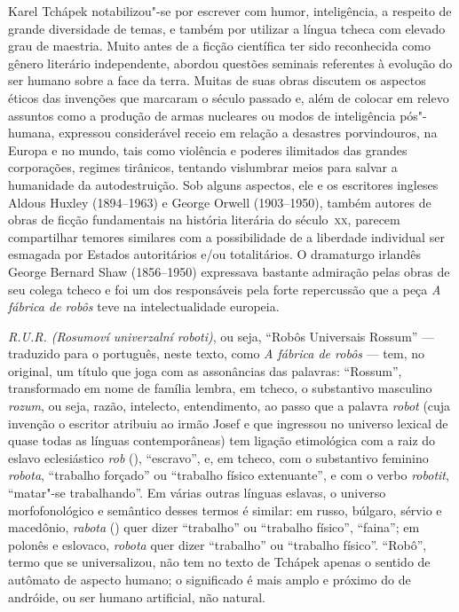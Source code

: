 Karel Tchápek notabilizou"-se por escrever com humor, inteligência, a respeito
de grande diversidade de temas, e também por utilizar a língua tcheca com
elevado grau de maestria. Muito antes de a ficção científica ter sido
reconhecida como gênero literário independente, abordou questões seminais
referentes à evolução do ser humano sobre a face da terra. Muitas de suas obras
discutem os aspectos éticos das invenções que marcaram o século passado e, além
de colocar em relevo assuntos como a produção de armas nucleares ou modos de
inteligência pós"-humana, expressou considerável receio em relação a desastres
porvindouros, na Europa e no mundo, tais como violência e poderes ilimitados
das grandes corporações, regimes tirânicos, tentando vislumbrar meios para
salvar a humanidade da autodestruição.  Sob alguns aspectos, ele e os
escritores ingleses Aldous Huxley (1894--1963) e George Orwell (1903--1950),
também autores de obras de ficção fundamentais na história literária do século~\textsc{xx},
parecem compartilhar temores similares com a possibilidade de a liberdade
individual ser esmagada por Estados autoritários e/ou totalitários. O
dramaturgo irlandês George Bernard Shaw (1856--1950) expressava bastante
admiração pelas obras de seu colega tcheco e foi um dos responsáveis pela forte
repercussão que a peça \textit{A fábrica de robôs} teve na intelectualidade europeia.

\textit{R.U.R. (Rosumoví univerzalní roboti)}, ou seja,  ``Robôs Universais Rossum''  ---
traduzido para o português, neste texto, como \textit{A fábrica de robôs} --- tem, no
original,  um título que joga com as assonâncias das palavras: ``Rossum'',
transformado em nome de família lembra, em tcheco, o substantivo masculino
\textit{rozum}, ou seja, razão, intelecto, entendimento, ao passo que a palavra \textit{robot}
(cuja invenção o escritor atribuiu ao irmão Josef e que ingressou no universo
lexical de quase todas as línguas contemporâneas) tem ligação etimológica com a
raiz do eslavo eclesiástico \textit{rob} (), ``escravo'', e, em tcheco,
com o substantivo feminino \textit{robota}, ``trabalho forçado'' ou ``trabalho físico
extenuante'', e com o verbo \textit{robotit}, ``matar"-se trabalhando''. Em várias outras
línguas eslavas, o universo morfofonológico e semântico desses termos é
similar: em russo, búlgaro, sérvio e macedônio, \textit{rabota} ()
quer dizer ``trabalho'' ou ``trabalho físico'', ``faina''; em polonês e eslovaco, \textit{robota}
quer dizer ``trabalho'' ou ``trabalho físico''. ``Robô'', termo que se universalizou, não
tem no texto de Tchápek apenas o sentido de autômato de aspecto humano; o
significado é mais amplo e próximo do de andróide, ou ser humano artificial,
não natural. 

